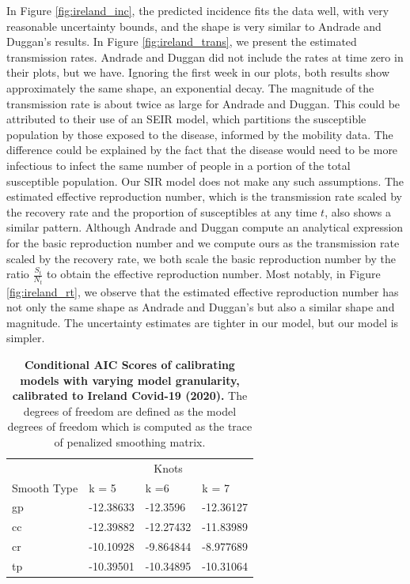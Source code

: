 \documentclass[
11pt, %
oneside, %
english, %
singlespacing, %
]{macthesis} %
\begin{document}
In Figure \ref{fig:ireland_inc}, the predicted incidence fits the data well, with very reasonable uncertainty bounds, and the shape is very similar to Andrade and Duggan's results. In Figure \ref{fig:ireland_trans}, we present the estimated transmission rates. Andrade and Duggan did not include the rates at time zero in their plots, but we have. Ignoring the first week in our plots, both results show approximately the same shape, an exponential decay. The magnitude of the transmission rate is about twice as large for Andrade and Duggan. This could be attributed to their use of an SEIR model, which partitions the susceptible population by those exposed to the disease, informed by the mobility data. The difference could be explained by the fact that the disease would need to be more infectious to infect the same number of people in a portion of the total susceptible population. Our SIR model does not make any such assumptions. The estimated effective reproduction number, which is the transmission rate scaled by the recovery rate and the proportion of susceptibles at any time \(t\), also shows a similar pattern. Although Andrade and Duggan compute an analytical expression for the basic reproduction number and we compute ours as the transmission rate scaled by the recovery rate, we both scale the basic reproduction number by the ratio \(\frac{S_t}{N_t}\) to obtain the effective reproduction number. Most notably, in Figure \ref{fig:ireland_rt}, we observe that the estimated effective reproduction number has not only the same shape as Andrade and Duggan's but also a similar shape and magnitude. The uncertainty estimates are tighter in our model, but our model is simpler.

\begin{table}[!h]
\centering
\caption{\label{tab:aic-table-ireland}\textbf{Conditional AIC Scores of calibrating models with varying model granularity, calibrated to Ireland Covid-19 (2020).} The degrees of freedom are defined as the model degrees of freedom which is computed as the trace of penalized smoothing matrix.}
\centering
\begin{tabular}[t]{llll}
\toprule
\multicolumn{1}{c}{ } & \multicolumn{3}{c}{Knots} \\
\cmidrule(l{3pt}r{3pt}){2-4}
Smooth Type & k = 5 & k =6 & k = 7\\
\midrule
gp & -12.38633 & -12.3596 & -12.36127\\
cc & -12.39882 & -12.27432 & -11.83989\\
cr & -10.10928 & -9.864844 & -8.977689\\
tp & -10.39501 & -10.34895 & -10.31064\\
\bottomrule
\end{tabular}
\end{table}
\end{document}
